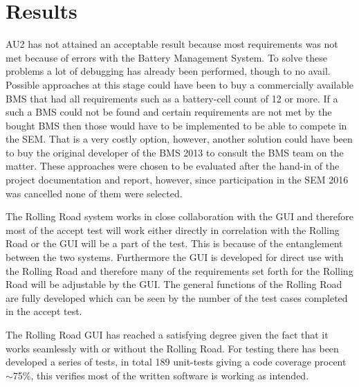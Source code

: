 \chapter{Results}
AU2 has not attained an acceptable result because most requirements  was not met because of errors with the Battery Management System. To solve these problems a lot of debugging has already been performed, though to no avail. Possible approaches at this stage could have been to buy a commercially available BMS that had all requirements such as a battery-cell count of 12 or more. If a such a BMS could not be found and certain requirements are not met by the bought BMS then those would have to be implemented to be able to compete in the SEM. That is a very costly option, however, another solution could have been to buy the original developer of the BMS 2013 to consult the BMS team on the matter. These approaches were chosen to be evaluated after the hand-in of the project documentation and report, however, since participation in the SEM 2016 was cancelled none of them were selected. 

The Rolling Road system works in close collaboration with the GUI and therefore most of the accept test will work either directly in correlation with the Rolling Road or the GUI will be a part of the test. This is because of the entanglement between the two systems. Furthermore the GUI is developed for direct use with the Rolling Road and therefore many of the requirements set forth for the Rolling Road will be adjustable by the GUI. The general functions of the Rolling Road are fully developed which can be seen by the number of the test cases completed in the accept test.   

The Rolling Road GUI has reached a satisfying degree given the fact that it works seamlessly with or without the Rolling Road. For testing there has been developed a series of tests, in total 189 unit-tests giving a code coverage procent $\sim$75\%, this verifies most of the written software is working as intended. 

